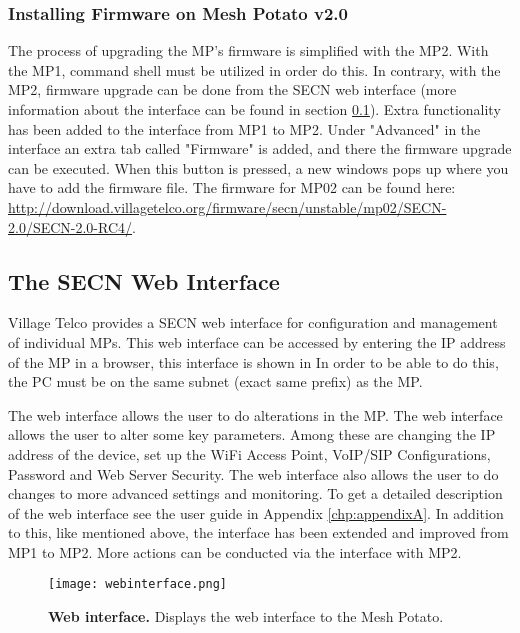\subsubsection{Installing Firmware on Mesh Potato v2.0}
The process of upgrading the MP's firmware is simplified with the MP2. With the MP1, command shell must be utilized in order do this. In contrary, with the MP2, firmware upgrade can be done from the SECN web interface (more information about the interface can be found in section \ref{subsec:interface}). Extra functionality has been added to the interface from MP1 to MP2. Under "Advanced" in the interface an extra tab called "Firmware" is added, and there the firmware upgrade can be executed. When this button is pressed, a new windows pops up where you have to add the firmware file. The firmware for MP02 can be found here: \url{http://download.villagetelco.org/firmware/secn/unstable/mp02/SECN-2.0/SECN-2.0-RC4/}.

\subsection{The SECN Web Interface}
\label{subsec:interface}
Village Telco provides a SECN web interface for configuration and management of individual MPs. This web interface can be accessed by entering the IP address of the MP in a browser, this interface is shown in  In order to be able to do this, the PC must be on the same subnet (exact same prefix) as the MP.  

The web interface allows the user to do alterations in the MP. The web interface allows the user to alter some key parameters. Among these are changing the IP address of the device, set up the WiFi Access Point, VoIP/SIP Configurations, Password and Web Server Security. The web interface also allows the user to do changes to more advanced settings and monitoring. To get a detailed description of the web interface see the user guide in Appendix \ref{chp:appendixA}. In addition to this, like mentioned above, the interface has been extended and improved from MP1 to MP2. More actions can be conducted via the interface with MP2. 

\begin{figure}[t]
  \centering
      \texttt{[image: webinterface.png]}
  \caption [Web interface]{\textbf{Web interface.} Displays the web interface to the Mesh Potato.}
  \label{fig:webinterface}
\end{figure}


